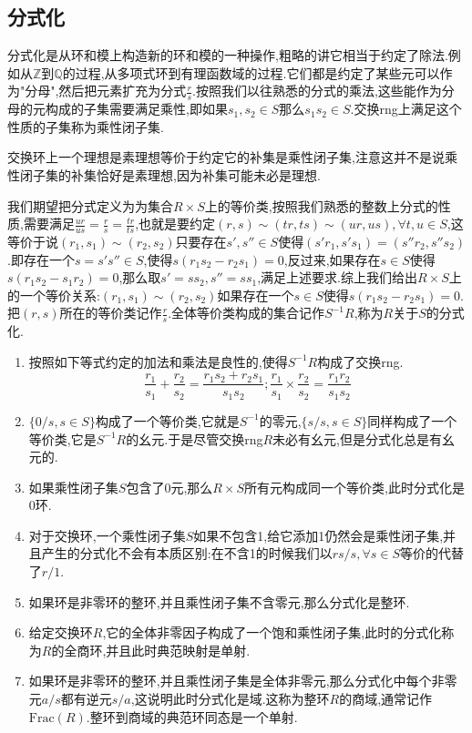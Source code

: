 \newpage
\subsection{分式化}

分式化是从环和模上构造新的环和模的一种操作,粗略的讲它相当于约定了除法.例如从$\mathbb{Z}$到$\mathbb{Q}$的过程,从多项式环到有理函数域的过程.它们都是约定了某些元可以作为"分母",然后把元素扩充为分式$\frac{r}{s}$.按照我们以往熟悉的分式的乘法,这些能作为分母的元构成的子集需要满足乘性,即如果$s_1,s_2\in S$那么$s_1s_2\in S$.交换rng上满足这个性质的子集称为乘性闭子集.

交换环上一个理想是素理想等价于约定它的补集是乘性闭子集,注意这并不是说乘性闭子集的补集恰好是素理想,因为补集可能未必是理想.

我们期望把分式定义为为集合$R\times S$上的等价类,按照我们熟悉的整数上分式的性质,需要满足$\frac{ur} {us}=\frac{r}{s}=\frac{tr}{ts}$,也就是要约定$(r,s)\sim(tr,ts)\sim(ur,us),\forall t,u\in S$,这等价于说$(r_1,s_1)\sim(r_2,s_2)$只要存在$s',s''\in S$使得$(s'r_1,s's_1)= (s''r_2,s''s_2)$.即存在一个$s=s's''\in S$,使得$s(r_1s_2-r_2s_1)=0$,反过来,如果存在$s\in S$使得$s(r_1s_2-s_1r_2)=0$,那么取$s'=ss_2,s''=ss_1$,满足上述要求.综上我们给出$R\times S$上的一个等价关系:$(r_1,s_1)\sim(r_2,s_2)$如果存在一个$s\in S$使得$s(r_1s_2-r_2s_1)=0$.把$(r,s)$所在的等价类记作$\frac{r}{s}$.全体等价类构成的集合记作$S^{-1}R$,称为$R$关于$S$的分式化.
\begin{enumerate}
	\item 按照如下等式约定的加法和乘法是良性的,使得$S^{-1}R$构成了交换rng.
	$$\frac{r_1}{s_1}+\frac{r_2}{s_2}=\frac{r_1s_2+r_2s_1}{s_1s_2};\frac{r_1}{s_1}\times\frac{r_2}{s_2}=\frac{r_1r_2}{s_1s_2}$$
	\item $\{0/s,s\in S\}$构成了一个等价类,它就是$S^{-1}$的零元,$\{s/s,s\in S\}$同样构成了一个等价类,它是$S^{-1}R$的幺元.于是尽管交换rng$R$未必有幺元,但是分式化总是有幺元的.
	\item 如果乘性闭子集$S$包含了0元,那么$R\times S$所有元构成同一个等价类,此时分式化是0环.
	\item 对于交换环,一个乘性闭子集$S$如果不包含1,给它添加1仍然会是乘性闭子集,并且产生的分式化不会有本质区别:在不含1的时候我们以$rs/s,\forall s\in S$等价的代替了$r/1$.
	\item 如果环是非零环的整环,并且乘性闭子集不含零元,那么分式化是整环.
	\item 给定交换环$R$,它的全体非零因子构成了一个饱和乘性闭子集,此时的分式化称为$R$的全商环,并且此时典范映射是单射.
	\item 如果环是非零环的整环,并且乘性闭子集是全体非零元,那么分式化中每个非零元$a/s$都有逆元$s/a$,这说明此时分式化是域.这称为整环$R$的商域,通常记作$\mathrm{Frac}(R)$.整环到商域的典范环同态是一个单射.
\end{enumerate}

